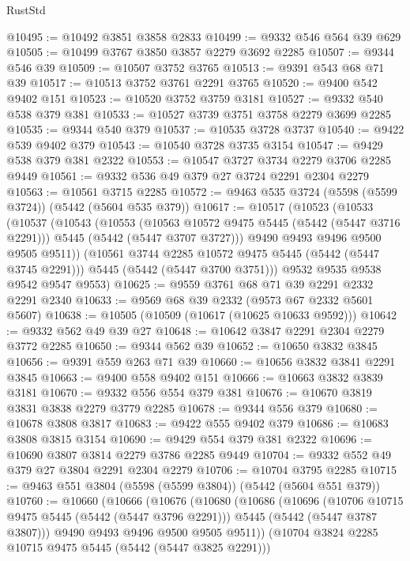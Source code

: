 \begin{lexlean}{RustStd}
\begin{coremodule}
@10495 := @10492 @3851 @3858 @2833
@10499 := @9332 @546 @564 @39 @629
@10505 := @10499 @3767 @3850 @3857 @2279 @3692 @2285
@10507 := @9344 @546 @39
@10509 := @10507 @3752 @3765
@10513 := @9391 @543 @68 @71 @39
@10517 := @10513 @3752 @3761 @2291 @3765
@10520 := @9400 @542 @9402 @151
@10523 := @10520 @3752 @3759 @3181
@10527 := @9332 @540 @538 @379 @381
@10533 := @10527 @3739 @3751 @3758 @2279 @3699 @2285
@10535 := @9344 @540 @379
@10537 := @10535 @3728 @3737
@10540 := @9422 @539 @9402 @379
@10543 := @10540 @3728 @3735 @3154
@10547 := @9429 @538 @379 @381 @2322
@10553 := @10547 @3727 @3734 @2279 @3706 @2285 @9449
@10561 := @9332 @536 @49 @379 @27 @3724 @2291 @2304 @2279
@10563 := @10561 @3715 @2285
@10572 := @9463 @535 @3724 (@5598 (@5599 @3724)) (@5442 (@5604 @535 @379))
@10617 := @10517
    (@10523
      (@10533
        (@10537
          (@10543
            (@10553
              (@10563 @10572 @9475 @5445 (@5442 (@5447 @3716 @2291)))
              @5445
              (@5442 (@5447 @3707 @3727)))
            @9490
            @9493
            @9496
            @9500
            @9505
            @9511))
        (@10561 @3744 @2285 @10572 @9475 @5445 (@5442 (@5447 @3745 @2291)))
        @5445
        (@5442 (@5447 @3700 @3751)))
      @9532
      @9535
      @9538
      @9542
      @9547
      @9553)
@10625 := @9559 @3761 @68 @71 @39 @2291 @2332 @2291 @2340
@10633 := @9569 @68 @39 @2332 (@9573 @67 @2332 @5601 @5607)
@10638 := @10505 (@10509 (@10617 (@10625 @10633 @9592)))
@10642 := @9332 @562 @49 @39 @27
@10648 := @10642 @3847 @2291 @2304 @2279 @3772 @2285
@10650 := @9344 @562 @39
@10652 := @10650 @3832 @3845
@10656 := @9391 @559 @263 @71 @39
@10660 := @10656 @3832 @3841 @2291 @3845
@10663 := @9400 @558 @9402 @151
@10666 := @10663 @3832 @3839 @3181
@10670 := @9332 @556 @554 @379 @381
@10676 := @10670 @3819 @3831 @3838 @2279 @3779 @2285
@10678 := @9344 @556 @379
@10680 := @10678 @3808 @3817
@10683 := @9422 @555 @9402 @379
@10686 := @10683 @3808 @3815 @3154
@10690 := @9429 @554 @379 @381 @2322
@10696 := @10690 @3807 @3814 @2279 @3786 @2285 @9449
@10704 := @9332 @552 @49 @379 @27 @3804 @2291 @2304 @2279
@10706 := @10704 @3795 @2285
@10715 := @9463 @551 @3804 (@5598 (@5599 @3804)) (@5442 (@5604 @551 @379))
@10760 := @10660
    (@10666
      (@10676
        (@10680
          (@10686
            (@10696
              (@10706 @10715 @9475 @5445 (@5442 (@5447 @3796 @2291)))
              @5445
              (@5442 (@5447 @3787 @3807)))
            @9490
            @9493
            @9496
            @9500
            @9505
            @9511))
        (@10704 @3824 @2285 @10715 @9475 @5445 (@5442 (@5447 @3825 @2291)))

\end{coremodule}
\end{lexlean}
